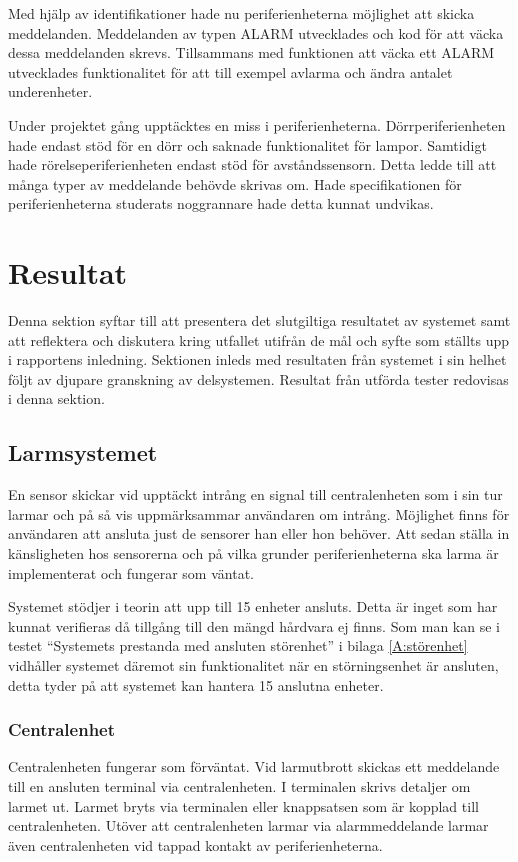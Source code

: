 \documentclass[a4paper]{article}
\begin{document}
Med hjälp av identifikationer hade nu periferienheterna möjlighet att skicka meddelanden.
Meddelanden av typen ALARM utvecklades och kod för att väcka dessa meddelanden skrevs.
Tillsammans med funktionen att väcka ett ALARM utvecklades funktionalitet för att till exempel avlarma och ändra antalet underenheter.

Under projektet gång upptäcktes en miss i periferienheterna.
Dörrperiferienheten hade endast stöd för en dörr och saknade funktionalitet för lampor.
Samtidigt hade rörelseperiferienheten endast stöd för avståndssensorn.
Detta ledde till att många typer av meddelande behövde skrivas om.
Hade specifikationen för periferienheterna studerats noggrannare hade detta kunnat undvikas.

\newpage
\section{Resultat}
Denna sektion syftar till att presentera det slutgiltiga resultatet av systemet samt att reflektera och diskutera kring utfallet utifrån de mål och syfte som ställts upp i rapportens inledning.
Sektionen inleds med resultaten från systemet i sin helhet följt av djupare granskning av delsystemen.
Resultat från utförda tester redovisas i denna sektion.

\subsection{Larmsystemet}
En sensor skickar vid upptäckt intrång en signal till centralenheten som i sin tur larmar och på så vis uppmärksammar användaren om intrång.
Möjlighet finns för användaren att ansluta just de sensorer han eller hon behöver.
Att sedan ställa in känsligheten hos sensorerna och på vilka grunder periferienheterna ska larma är implementerat och fungerar som väntat.

Systemet stödjer i teorin att upp till 15 enheter ansluts. Detta är inget som har kunnat verifieras då tillgång till den mängd hårdvara ej finns.
Som man kan se i testet ``Systemets prestanda med ansluten störenhet'' i bilaga \ref{A:störenhet} vidhåller systemet däremot sin funktionalitet när en störningsenhet är ansluten, detta tyder på att systemet kan hantera 15 anslutna enheter.

\subsubsection{Centralenhet}
Centralenheten fungerar som förväntat.
Vid larmutbrott skickas ett meddelande till en ansluten terminal via centralenheten.
I terminalen skrivs detaljer om larmet ut.
Larmet bryts via terminalen eller knappsatsen som är kopplad till centralenheten.
Utöver att centralenheten larmar via alarmmeddelande larmar även centralenheten vid tappad kontakt av periferienheterna.
\end{document}
